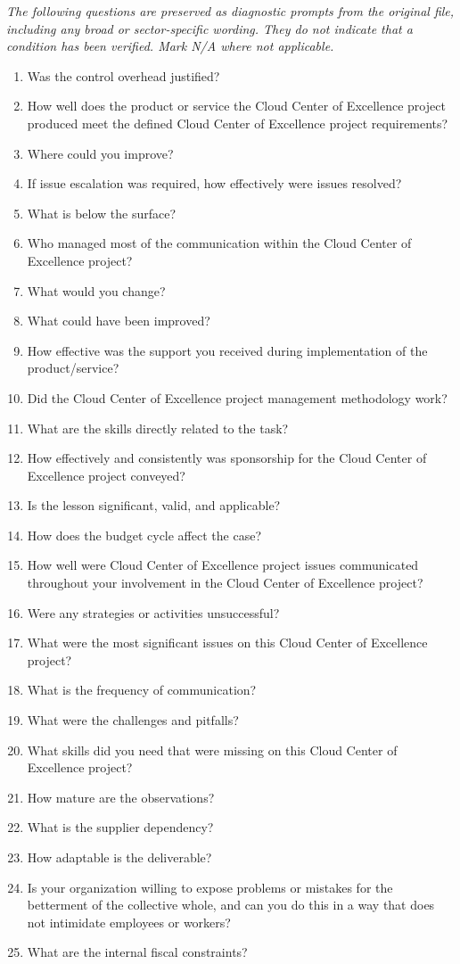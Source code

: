 \documentclass[10pt,letterpaper]{article}
\newcommand{\docsection}[1]{\par\Needspace{5\baselineskip}\vspace{8pt}{\large\sffamily\bfseries\color{navy}#1}\par\vspace{2pt}{\color{rulegrey}\rule{\linewidth}{.6pt}}\par}
\begin{document}
\docsection{03 \quad Source diagnostic checklist}
\textit{The following questions are preserved as diagnostic prompts from the original file, including any broad or sector-specific wording. They do not indicate that a condition has been verified. Mark N/A where not applicable.}
\begingroup\small\begin{enumerate}[leftmargin=2.1em, itemsep=4pt]
\item[1.] Was the control overhead justified?
\item[2.] How well does the product or service the Cloud Center of Excellence project produced meet the defined Cloud Center of Excellence project requirements?
\item[3.] Where could you improve?
\item[4.] If issue escalation was required, how effectively were issues resolved?
\item[5.] What is below the surface?
\item[6.] Who managed most of the communication within the Cloud Center of Excellence project?
\item[7.] What would you change?
\item[8.] What could have been improved?
\item[9.] How effective was the support you received during implementation of the product/service?
\item[10.] Did the Cloud Center of Excellence project management methodology work?
\item[11.] What are the skills directly related to the task?
\item[12.] How effectively and consistently was sponsorship for the Cloud Center of Excellence project conveyed?
\item[13.] Is the lesson significant, valid, and applicable?
\item[14.] How does the budget cycle affect the case?
\item[15.] How well were Cloud Center of Excellence project issues communicated throughout your involvement in the Cloud Center of Excellence project?
\item[16.] Were any strategies or activities unsuccessful?
\item[17.] What were the most significant issues on this Cloud Center of Excellence project?
\item[18.] What is the frequency of communication?
\item[19.] What were the challenges and pitfalls?
\item[20.] What skills did you need that were missing on this Cloud Center of Excellence project?
\item[21.] How mature are the observations?
\item[22.] What is the supplier dependency?
\item[23.] How adaptable is the deliverable?
\item[24.] Is your organization willing to expose problems or mistakes for the betterment of the collective whole, and can you do this in a way that does not intimidate employees or workers?
\item[25.] What are the internal fiscal constraints?
\end{enumerate}\endgroup
\end{document}
